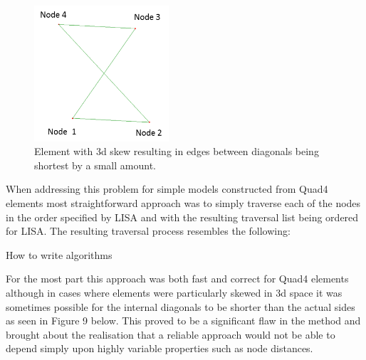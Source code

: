 \begin{figure}[!h]
  \centerline{\includegraphics[width=50mm , scale=1]{../Graphics/BadlyOrderedNodes.png}}
  \caption{Element with 3d skew resulting in edges between diagonals being shortest by a small amount.
  }
  \label{fig:h-refinementImp}
\end{figure}

When addressing this problem for simple models constructed from Quad4 elements most straightforward approach was to simply traverse each of the nodes in the order specified by LISA and with the resulting traversal list being ordered for LISA. The resulting traversal process resembles the following: \\


\begin{algorithm}[H]


 \caption{How to write algorithms}
\end{algorithm}

\noindent
For the most part this approach was both fast and correct for Quad4 elements although in cases where elements were particularly skewed in 3d space it was sometimes possible for the internal diagonals to be shorter than the actual sides as seen in Figure 9 below. This proved to be a significant flaw in the method and brought about the realisation that a reliable approach would not be able to depend simply upon highly variable properties such as node distances. \\ 

